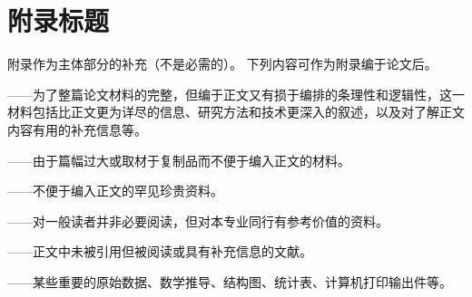 \chapter{附录标题}

附录作为主体部分的补充（不是必需的）。
下列内容可作为附录编于论文后。

——为了整篇论文材料的完整，但编于正文又有损于编排的条理性和逻辑性，这一材料包括比正文更为详尽的信息、研究方法和技术更深入的叙述，以及对了解正文内容有用的补充信息等。

——由于篇幅过大或取材于复制品而不便于编入正文的材料。

——不便于编入正文的罕见珍贵资料。

——对一般读者并非必要阅读，但对本专业同行有参考价值的资料。

——正文中未被引用但被阅读或具有补充信息的文献。

——某些重要的原始数据、数学推导、结构图、统计表、计算机打印输出件等。
